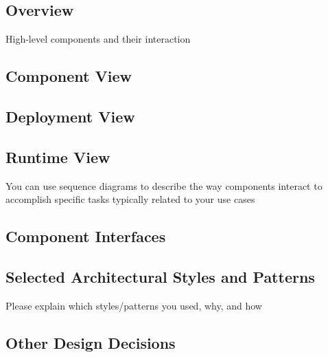 \subsection{Overview}
 High-level components and their interaction
\subsection{Component View}
\subsection{Deployment View}
\subsection{Runtime View}
You can use sequence diagrams to describe the way components interact
to accomplish specific tasks typically related to your use cases
\subsection{Component Interfaces}
\subsection{Selected Architectural Styles and Patterns}
Please explain which styles/patterns you used, why, and how
\subsection{Other Design Decisions}